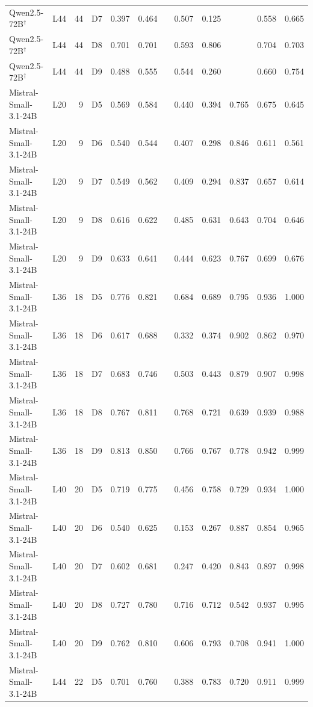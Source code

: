 \begin{table}
\begin{tabular}{llrlrrrrrrrr}
Qwen2.5-72B$^\dagger$ & L44 & 44 & D7 & 0.397 & 0.464 &  & 0.507 & 0.125 &  & 0.558 & 0.665 \\
Qwen2.5-72B$^\dagger$ & L44 & 44 & D8 & 0.701 & 0.701 &  & 0.593 & 0.806 &  & 0.704 & 0.703 \\
Qwen2.5-72B$^\dagger$ & L44 & 44 & D9 & 0.488 & 0.555 &  & 0.544 & 0.260 &  & 0.660 & 0.754 \\
Mistral-Small-3.1-24B & L20 & 9 & D5 & 0.569 & 0.584 &  & 0.440 & 0.394 & 0.765 & 0.675 & 0.645 \\
Mistral-Small-3.1-24B & L20 & 9 & D6 & 0.540 & 0.544 &  & 0.407 & 0.298 & 0.846 & 0.611 & 0.561 \\
Mistral-Small-3.1-24B & L20 & 9 & D7 & 0.549 & 0.562 &  & 0.409 & 0.294 & 0.837 & 0.657 & 0.614 \\
Mistral-Small-3.1-24B & L20 & 9 & D8 & 0.616 & 0.622 &  & 0.485 & 0.631 & 0.643 & 0.704 & 0.646 \\
Mistral-Small-3.1-24B & L20 & 9 & D9 & 0.633 & 0.641 &  & 0.444 & 0.623 & 0.767 & 0.699 & 0.676 \\
Mistral-Small-3.1-24B & L36 & 18 & D5 & 0.776 & 0.821 &  & 0.684 & 0.689 & 0.795 & 0.936 & 1.000 \\
Mistral-Small-3.1-24B & L36 & 18 & D6 & 0.617 & 0.688 &  & 0.332 & 0.374 & 0.902 & 0.862 & 0.970 \\
Mistral-Small-3.1-24B & L36 & 18 & D7 & 0.683 & 0.746 &  & 0.503 & 0.443 & 0.879 & 0.907 & 0.998 \\
Mistral-Small-3.1-24B & L36 & 18 & D8 & 0.767 & 0.811 &  & 0.768 & 0.721 & 0.639 & 0.939 & 0.988 \\
Mistral-Small-3.1-24B & L36 & 18 & D9 & 0.813 & 0.850 &  & 0.766 & 0.767 & 0.778 & 0.942 & 0.999 \\
Mistral-Small-3.1-24B & L40 & 20 & D5 & 0.719 & 0.775 &  & 0.456 & 0.758 & 0.729 & 0.934 & 1.000 \\
Mistral-Small-3.1-24B & L40 & 20 & D6 & 0.540 & 0.625 &  & 0.153 & 0.267 & 0.887 & 0.854 & 0.965 \\
Mistral-Small-3.1-24B & L40 & 20 & D7 & 0.602 & 0.681 &  & 0.247 & 0.420 & 0.843 & 0.897 & 0.998 \\
Mistral-Small-3.1-24B & L40 & 20 & D8 & 0.727 & 0.780 &  & 0.716 & 0.712 & 0.542 & 0.937 & 0.995 \\
Mistral-Small-3.1-24B & L40 & 20 & D9 & 0.762 & 0.810 &  & 0.606 & 0.793 & 0.708 & 0.941 & 1.000 \\
Mistral-Small-3.1-24B & L44 & 22 & D5 & 0.701 & 0.760 &  & 0.388 & 0.783 & 0.720 & 0.911 & 0.999 \\

\end{tabular}
\end{table}
